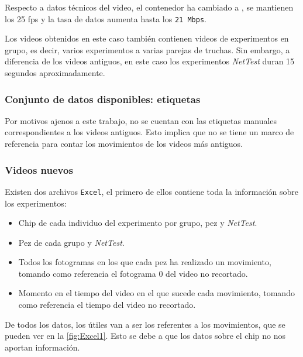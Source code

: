 Respecto a datos técnicos del video, el contenedor ha cambiado a \texttt{}, se mantienen los 25 \acrshort{fps} y la tasa de datos aumenta hasta los \texttt{21 Mbps}.

Los videos obtenidos en este caso también contienen videos de experimentos en grupo, es decir, varios experimentos a varias parejas de truchas. Sin embargo, a diferencia de los videos antiguos, 
en este caso los experimentos \textit{NetTest} duran 15 segundos aproximadamente.

\subsubsection{Conjunto de datos disponibles: etiquetas}

Por motivos ajenos a este trabajo, no se cuentan con las etiquetas manuales correspondientes a los videos antiguos. Esto implica que no se tiene un marco de referencia para 
contar los movimientos de los videos más antiguos.

\subsubsection*{Videos nuevos}

Existen dos archivos \texttt{Excel}, el primero de ellos contiene toda la información sobre los experimentos:
\begin{itemize}
    \item Chip de cada individuo del experimento por grupo, pez y \textit{NetTest}.
    \item Pez de cada grupo y \textit{NetTest}.
    \item Todos los fotogramas en los que cada pez ha realizado un movimiento, tomando como referencia el fotograma 0 del video no recortado.
    \item Momento en el tiempo del video en el que sucede cada movimiento, tomando como referencia el tiempo del video no recortado.
\end{itemize}

De todos los datos, los útiles van a ser los referentes a los movimientos, que se pueden ver en la \autoref{fig:Excel1}. Esto se debe a que los datos sobre el chip no nos aportan información.

